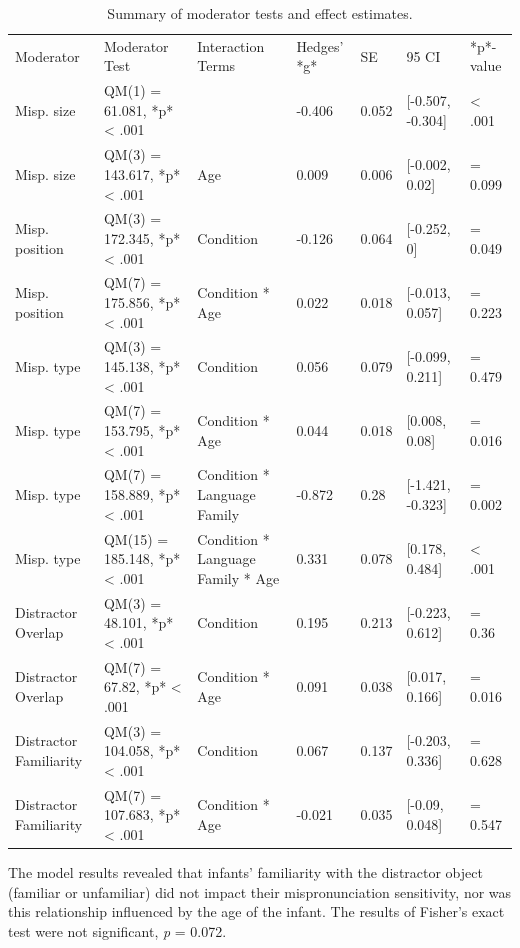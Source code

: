 \documentclass[man, noextraspace]{apa6}
\makeatletter
\newenvironment{lltable}{\begin{landscape}\begin{center}\begin{ThreePartTable}}{\end{ThreePartTable}\end{center}\end{landscape}}
\newcommand\LastLTentrywidth{1em}
\newlength\longtablewidth
\newcommand{\getlongtablewidth}{\begingroup \ifcsname LT@\roman{LT@tables}\endcsname \global\longtablewidth=0pt \renewcommand{\LT@entry}[2]{\global\advance\longtablewidth by ##2\relax\gdef\LastLTentrywidth{##2}}\@nameuse{LT@\roman{LT@tables}} \fi \endgroup}
\makeatother
\begin{document}
\begin{lltable}


\scriptsize{
\begin{longtable}{lllllll}\noalign{\getlongtablewidth\global\LTcapwidth=\longtablewidth}
\caption{\label{tab:mod_table_finalize}Summary of moderator tests and effect estimates.}\\
\toprule
Moderator & Moderator Test & Interaction Terms & Hedges' *g* & SE & 95 CI & *p*-value\\
\midrule
Misp. size & QM(1) = 61.081, *p* < .001 &  & -0.406 & 0.052 & [-0.507, -0.304] & < .001\\
Misp. size & QM(3) = 143.617, *p* < .001 & Age & 0.009 & 0.006 & [-0.002, 0.02] & = 0.099\\
Misp. position & QM(3) = 172.345, *p* < .001 & Condition & -0.126 & 0.064 & [-0.252, 0] & = 0.049\\
Misp. position & QM(7) = 175.856, *p* < .001 & Condition * Age & 0.022 & 0.018 & [-0.013, 0.057] & = 0.223\\
Misp. type & QM(3) = 145.138, *p* < .001 & Condition & 0.056 & 0.079 & [-0.099, 0.211] & = 0.479\\
Misp. type & QM(7) = 153.795, *p* < .001 & Condition * Age & 0.044 & 0.018 & [0.008, 0.08] & = 0.016\\
Misp. type & QM(7) = 158.889, *p* < .001 & Condition * Language Family & -0.872 & 0.28 & [-1.421, -0.323] & = 0.002\\
Misp. type & QM(15) = 185.148, *p* < .001 & Condition * Language Family * Age & 0.331 & 0.078 & [0.178, 0.484] & < .001\\
Distractor Overlap & QM(3) = 48.101, *p* < .001 & Condition & 0.195 & 0.213 & [-0.223, 0.612] & = 0.36\\
Distractor Overlap & QM(7) = 67.82, *p* < .001 & Condition * Age & 0.091 & 0.038 & [0.017, 0.166] & = 0.016\\
Distractor Familiarity & QM(3) = 104.058, *p* < .001 & Condition & 0.067 & 0.137 & [-0.203, 0.336] & = 0.628\\
Distractor Familiarity & QM(7) = 107.683, *p* < .001 & Condition * Age & -0.021 & 0.035 & [-0.09, 0.048] & = 0.547\\
\bottomrule
\end{longtable}
}
\end{lltable}

The model results revealed that infants' familiarity with the distractor object (familiar or unfamiliar) did not impact their mispronunciation sensitivity, nor was this relationship influenced by the age of the infant. The results of Fisher's exact test were not significant, \emph{p} = 0.072.
\end{document}
